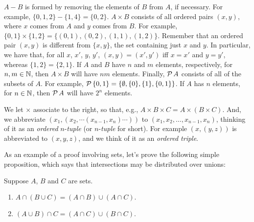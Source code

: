 $A-B$ is formed by removing the elements of $B$ from $A$, if
necessary.  For example, $\{0,1,2\}-\{1,4\}=\{0,2\}$.
$A\times B$ consists of all ordered pairs $(x,y)$,
%
%
where $x$ comes from $A$ and $y$ comes from $B$.  For example,
$\{0,1\}\times\{1,2\}=\{(0,1),(0,2),(1,1),(1,2)\}$.  Remember that an
ordered pair $(x,y)$ is different from $\{x,y\}$, the set containing
just $x$ and $y$.  In particular, we have that, for all
$x$, $x'$, $y$, $y'$, $(x,y)=(x',y')$ iff
$x=x'$ and $y=y'$, whereas $\{1,2\}=\{2,1\}$.
If $A$ and $B$ have $n$ and $m$ elements, respectively, for
$n,m\in\mathbb{N}$, then $A\times B$ will have $nm$ elements.  Finally,
${\cal P} \,A$ consists of all of the subsets of $A$.  For example,
${\cal P} \,\{0,1\}=\{\emptyset,\{0\},\{1\},\{0,1\}\}$.  If $A$ has $n$
elements, for $n\in\mathbb{N}$, then ${\cal P} \,A$ will have $2^n$ elements.

We let $\times$ associate to the right, so that, e.g.,
%
%
$A\times B\times C = A\times(B\times C)$.  And, we abbreviate
$(x_1,(x_2,\cdots(x_{n-1},x_n)\cdots))$ to
$(x_1,x_2,\ldots,x_{n-1},x_n)$, thinking of it as an \emph{ordered}
$n$-\emph{tuple} (or $n$-\emph{tuple} for short).
%
%
For example
$(x,(y,z))$ is abbreviated to $(x,y,z)$, and we think of it
as an \emph{ordered triple}.
%
%

As an example of a proof involving sets, let's prove
the following simple proposition, which says that intersections
may be distributed over unions:
%

\begin{proposition}
\label{InterOverUnionProp}
Suppose $A$, $B$ and $C$ are sets.

\begin{enumerate}[\quad(1)]
\item $A\cap(B\cup C)=(A\cap B)\cup(A\cap C)$.

\item $(A\cup B)\cap C=(A\cap C)\cup(B\cap C)$.
\end{enumerate}
\end{proposition}

